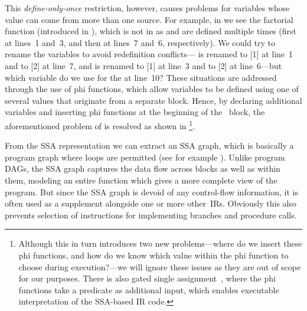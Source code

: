 This \emph{define-only-once} restriction, however, causes problems for variables
whose value can come from more than one source.
%
For example, in
 we see the factorial \gls{function}
(introduced in ), which is not in \tSSAform as
 and  are defined multiple times (first at lines~1
and~3, and then at lines~7 and~6, respectively).
%
We could try to rename the
variables to avoid redefinition conflicts--- is renamed to
[1] at line~1 and to [2] at line~7, and  is
renamed to [1] at line~3 and to [2] at line~6---but
which variable do we use for the  at line~10? These situations
are addressed through the use of \glspl{phi function}, which allow variables to
be defined using one of several values that originate from a separate
\gls{block}.
%
Hence, by declaring additional variables and inserting \glspl{phi
  function} at the beginning of the ~\gls{block}, the
aforementioned problem of  is resolved as shown in
\footnote{Although this in turn introduces two new
  problems---where do we insert these \glspl{phi function}, and how do we know
  which value within the \gls{phi function} to choose during execution?---we
  will ignore these issues as they are out of scope for our purposes.
%
There is
  also \gls{gated single assignment}~\cite{Ballance1990}, where the \glspl{phi
    function} take a predicate as additional input, which enables executable
  interpretation of the \gls{SSA}-based \gls{IR} code.}.

%    

From the \gls{SSA} representation we can extract an \gls{SSA graph}, which is
basically a \gls{program graph} where \glspl{loop} are permitted (see for
example ).
%
Unlike \glspl{program DAG}, the
\gls{SSA graph} captures the data flow across \glspl{block} as well as within
them, modeling an entire \gls{function} which gives a more complete view of the
\gls{program}.
%
But since the \gls{SSA graph} is devoid of any control-flow
information, it is often used as a supplement alongside one or more
other~\glspl{IR}.
%
Obviously this also prevents selection of \glspl{instruction}
for implementing branches and procedure calls.


